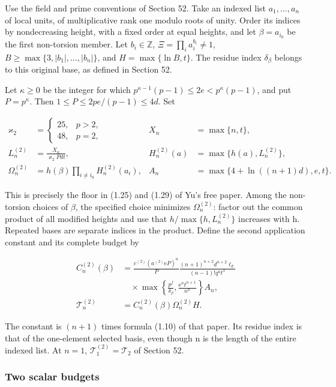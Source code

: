 \documentclass[
  11pt,
  a4paper,
]{article}
\begin{document}
Use the field and prime conventions of Section 52. Take an indexed list
\(a_1,\ldots,a_n\) of local units, of multiplicative rank one modulo
roots of unity. Order its indices by nondecreasing height, with a fixed
order at equal heights, and let \(\beta=a_{i_0}\) be the first
non-torsion member. Let \(b_i\in\mathbb Z\),
\(\Xi=\prod_i a_i^{b_i}\ne1\), \(B\ge\max\{3,|b_1|,\ldots,|b_n|\}\), and
\(H=\max\{\ln B,t\}\). The residue index \(\delta_\beta\) belongs to
this original base, as defined in Section 52.

Let \(\kappa\ge0\) be the integer for which
\(p^{\kappa-1}(p-1)\le2e<p^\kappa(p-1)\), and put \(P=p^\kappa\). Then
\(1\le P\le2pe/(p-1)\le4d\). Set

\[
\begin{aligned}
\varkappa_2&=\begin{cases}25,&p>2,\\48,&p=2,\end{cases}
&X_n&=\max\{n,t\},\\
L_n^{(2)}&=\frac{X_n}{\varkappa_2Pdt},
&H_n^{(2)}(a)&=\max\{h(a),L_n^{(2)}\},\\
\Omega_n^{(2)}&=h(\beta)\prod_{i\ne i_0}H_n^{(2)}(a_i),
&A_n&=\max\{4+\ln((n+1)d),e,t\}.
\end{aligned}
\tag{10.526}
\]

This is precisely the floor in (1.25) and (1.29) of Yu's free paper.
Among the non-torsion choices of \(\beta\), the specified choice
minimizes \(\Omega_n^{(2)}\): factor out the common product of all
modified heights and use that \(h/\max\{h,L_n^{(2)}\}\) increases with
h. Repeated bases are separate indices in the product. Define the second
application constant and its complete budget by

\[
\begin{aligned}
C_n^{(2)}(\beta)&=
\frac{c^{(2)}(a^{(2)}\mathrm e P)^n}{P}
\frac{(n+1)^{n+2}d^{n+2}\ell_d}
{(n-1)!q^ut^3}\\
&\quad\times
\max\left\{\frac{p^f}{\delta_\beta},
\frac{\mathrm e^n t^{n+1}}{n^n}\right\}A_n,\\
\mathcal T_n^{(2)}&=C_n^{(2)}(\beta)\Omega_n^{(2)}H.
\end{aligned}
\tag{10.527}
\]

The constant is \((n+1)\) times formula (1.10) of that paper. Its
residue index is that of the one-element selected basis, even though n
is the length of the entire indexed list. At \(n=1\),
\(\mathcal T_1^{(2)}=\mathcal T_2\) of Section 52.

\subsubsection{Two scalar budgets}\label{two-scalar-budgets}
\end{document}
